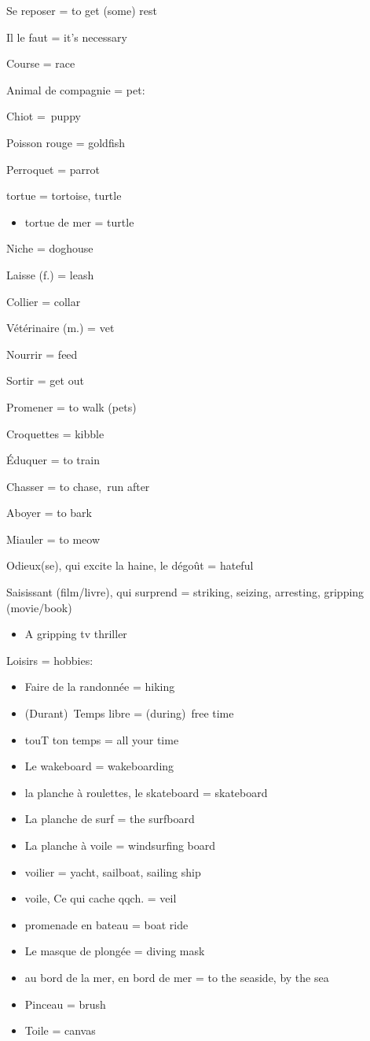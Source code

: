 Se reposer = to get (some) rest

Il le faut = it's necessary~

Course = race

Animal de compagnie = pet:

Chiot =~puppy~

Poisson rouge = goldfish

Perroquet = parrot~

tortue = tortoise, turtle

\begin{itemize}
\item
  tortue de mer = turtle
\end{itemize}

Niche = doghouse~

Laisse (f.) = leash

Collier = collar

Vétérinaire (m.) = vet

Nourrir = feed

Sortir = get out

Promener = to walk (pets)

Croquettes = kibble

Éduquer = to train

Chasser = to chase,~run after

Aboyer = to bark

Miauler = to meow~

Odieux(se), qui excite la haine, le dégoût = hateful

Saisissant (film/livre), qui surprend = striking, seizing, arresting,
gripping (movie/book)

\begin{itemize}
\item
  A gripping tv thriller
\end{itemize}

Loisirs = hobbies:

\begin{itemize}
\item
  Faire de la randonnée = hiking
\item
  (Durant)~Temps libre = (during)~free time
\item
  touT ton temps = all your time
\item
  Le wakeboard = wakeboarding~
\item
  {la planche à roulettes, le skateboard = skateboard}
\item
  La planche de surf = the surfboard~
\item
  La planche à voile = windsurfing board~
\item
  {voilier = yacht, sailboat, sailing ship}
\item
  {voile, Ce qui cache qqch. = veil}
\item
  {promenade en bateau = boat ride}
\item
  {Le masque de plongée = diving mask}
\item
  {au bord de la mer, en bord de mer = to the seaside, by the sea}
\item
  {Pinceau = brush~}
\item
  Toile = canvas~
\end{itemize}

